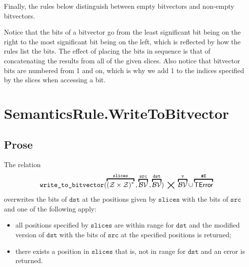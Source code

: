 \documentclass{book}
\newcommand\eqdef[0]{:=}
\newcommand\overname[2]{\overbracket{#1}^{#2}}
\newcommand\nvbitvector[0]{\texttt{Bitvector}}
\newcommand\tint[0]{\mathcal{Z}}
\newcommand\tbitvector[0]{\mathcal{B}\mathcal{V}}
\newcommand\evalarrow[0]{\stackrel{\mathsf{asl}}{\rightsquigarrow}}
\newcommand\aslsep[0]{\mathbf{,}}
\newcommand\sslash[0]{\mathbin{/\mkern-6mu/}}
\newcommand\terminateas[0]{\;\sslash\;}
\newcommand\ErrorConfig[0]{\texttt{\#E}}
\newcommand\TError[0]{\textsf{TError}}
\newcommand\vv[0]{\texttt{v}}
\newcommand\slices[0]{\texttt{slices}}
\newcommand\vb[0]{\texttt{b}}
\newcommand\bv[0]{\texttt{bv}}
\newcommand\src[0]{\texttt{src}}
\newcommand\dst[0]{\texttt{dst}}
\begin{document}
\begin{emptyformal}
Finally, the rules below distinguish between empty bitvectors and non-empty bitvectors.
Notice that the bits of a bitvector go from the least significant bit being on the right to the most significant bit being on the left,
which is reflected by how the rules list the bits.
The effect of placing the bits in sequence is that of concatenating the results
from all of the given slices.
Also notice that bitvector bits are numbered from 1 and on, which is why we add 1 to the indices specified
by the slices when accessing a bit.
\end{emptyformal}

\section{SemanticsRule.WriteToBitvector \label{sec:SemanticsRule.WriteToBitvector}}
\subsection{Prose}
The relation
\[
  \writetobitvector(\overname{(\tint\times\tint)^*}{\slices} \aslsep \overname{\tbitvector}{\src} \aslsep \overname{\tbitvector}{\dst})
  \;\bigtimes\; \overname{\tbitvector}{\vv} \cup \overname{\TError}{\ErrorConfig}
\]
overwrites the bits of $\dst$ at the positions given by $\slices$ with the bits of $\src$
and one of the following apply:
\begin{itemize}
  \item all positions specified by $\slices$ are within range for $\dst$ and the modified version
  of $\dst$ with the bits of $\src$ at the specified positions is returned;
  \item there exists a position in $\slices$ that is, not in range for $\dst$ and an error is returned.
\end{itemize}
\end{document}
